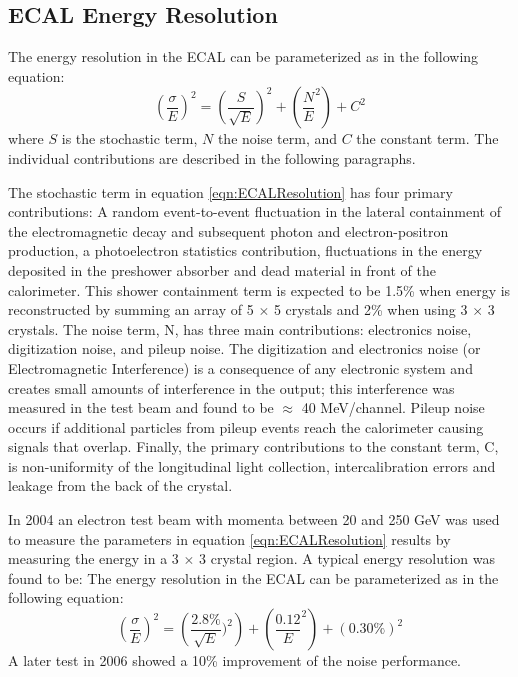 \subsection{ECAL Energy Resolution}
The energy resolution in the ECAL can be parameterized as in the following equation:
\begin{displaymath}
\left(\frac{\sigma}{E}\right)^{2}=\left(\frac{S}{\sqrt{E}}\right)^{2}+\left(\frac{N}{E}^{2}\right)+C^{2}
\label{eqn:ECALResolution}
\end{displaymath}
where $S$ is the stochastic term, $N$ the noise term, and $C$ the constant term. 
The individual contributions are described in the following paragraphs.

The stochastic term in equation \ref{eqn:ECALResolution} has four primary contributions:
A random event-to-event fluctuation in the lateral containment of the
electromagnetic decay and subsequent photon and electron-positron production,
a photoelectron statistics contribution, fluctuations in the energy
deposited in the preshower absorber and dead material in front of the calorimeter. %
This shower containment term is expected to be 1.5\% when energy is 
reconstructed by summing an array of 5 $\times$ 5 crystals and 2\%
when using 3 $\times$ 3 crystals. 
The noise term, N, has three main contributions: electronics noise, digitization 
noise, and pileup noise. The digitization and electronics noise (or Electromagnetic Interference)
is a consequence of any electronic system and creates small amounts of
interference in the output; this interference was measured in the test beam and 
found to be $\approx$ 40 MeV/channel. 
Pileup noise occurs if additional particles from pileup events reach the 
calorimeter causing signals that overlap. 
Finally, the primary contributions to the constant term, C, is non-uniformity
of the longitudinal light collection, intercalibration errors and leakage from the 
back of the crystal. 

In 2004 an electron test beam with momenta between 20 and 250 GeV 
was used to measure the parameters in equation \ref{eqn:ECALResolution}
results by measuring the energy in a 3 $\times$ 3 crystal region. A typical
energy resolution was found to be:
The energy resolution in the ECAL can be parameterized as in the following equation:
\begin{displaymath}
\left(\frac{\sigma}{E}\right)^{2}=\left(\frac{2.8\%}{\sqrt{E}})^{2}\right)+\left(\frac{0.12}{E}^{2}\right)+(0.30\%)^{2}
\label{eqn:ECALResolution}
\end{displaymath}
A later test in 2006 showed a 10\% improvement of the noise performance.



